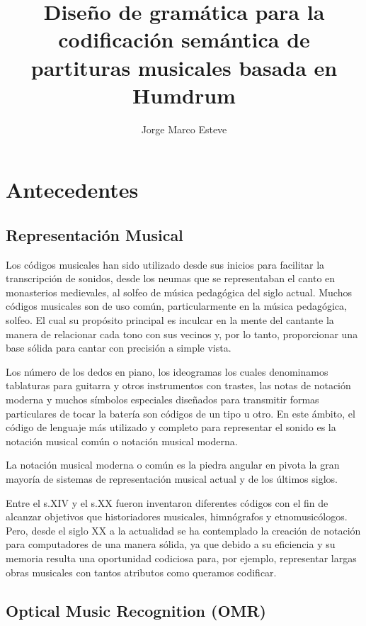 \documentclass{article}
\title{Diseño de gramática para la codificación semántica de partituras musicales basada en Humdrum}
\author{Jorge Marco Esteve}
\begin{document}
\maketitle

\section{Antecedentes}
\subsection{Representación Musical}
Los códigos musicales han sido utilizado desde sus inicios para facilitar la transcripción de sonidos, desde los neumas
que se representaban el canto en monasterios medievales, al solfeo de música pedagógica del siglo actual. Muchos códigos
musicales son de uso común, particularmente en la música pedagógica, solfeo. El cual su propósito principal es
inculcar en la mente del cantante la manera de relacionar cada tono con sus vecinos y, por lo tanto,
proporcionar una base sólida para cantar con precisión a simple vista.

Los número de los dedos en piano, los ideogramas los cuales denominamos tablaturas para guitarra y otros instrumentos con trastes,
las notas de notación moderna y muchos símbolos especiales diseñados para transmitir formas particulares de tocar la batería
son códigos de un tipo u otro. En este ámbito, el  código de lenguaje más utilizado y completo para representar el sonido
es la notación musical común o notación musical moderna.

La notación musical moderna o común es la piedra angular en pivota la gran mayoría de sistemas de representación musical actual
y de los últimos siglos.

Entre el s.XIV y el s.XX fueron inventaron diferentes códigos con el fin de alcanzar objetivos que historiadores musicales,
himnógrafos y etnomusicólogos. Pero, desde el siglo XX a la actualidad se ha contemplado la creación de notación para
computadores de una manera sólida, ya que debido a su eficiencia y su memoria resulta una oportunidad codiciosa para,
por ejemplo, representar largas obras musicales con tantos atributos como queramos codificar.

\subsection{Optical Music Recognition (OMR)\cite{OMR}}
\end{document}
